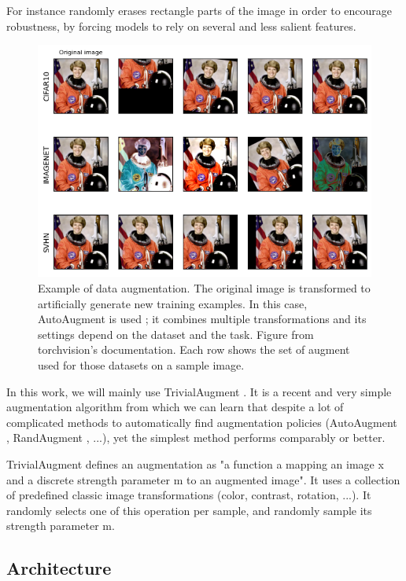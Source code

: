\label{sec:cutout}
For instance \cite{cutout} randomly erases rectangle parts of the image in order to encourage robustness, by forcing models to rely on several and less salient features.

\begin{figure}[t]
    \centering
    \includegraphics[width=\columnwidth]{70-files/autoaugment.png}
    \caption{Example of data augmentation. The original image is transformed to artificially generate new training examples. In this case, AutoAugment is used ; it combines multiple transformations and its settings depend on the dataset and the task. Figure from torchvision's documentation. Each row shows the set of augment used for those datasets on a sample image.}
    \label{fig:autoaugment}
\end{figure}

In this work, we will mainly use TrivialAugment \cite{trivialaugment}. It is a recent and very simple augmentation algorithm from which we can learn that despite a lot of complicated methods to automatically find augmentation policies (AutoAugment \cite{autoaugment}, RandAugment \cite{randaugment}, ...), yet the simplest method performs comparably or better.

TrivialAugment defines an augmentation as "a function a mapping an image x and a discrete strength parameter m to an augmented image". It uses a collection of predefined classic image transformations (color, contrast, rotation, ...). It randomly selects one of this operation per sample, and randomly sample its strength parameter m.

\subsection{Architecture}

